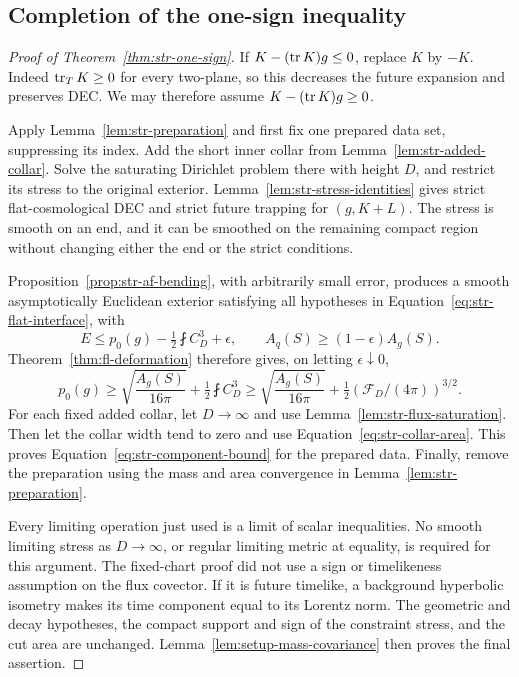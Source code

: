 \subsection{Completion of the one-sign inequality}

\begin{proof}[Proof of Theorem~\ref{thm:str-one-sign}]
If $K-(\operatorname{tr} K)g\leq0$, replace $K$ by $-K$. Indeed
$\operatorname{tr}_TK\geq0$ for every two-plane, so this decreases the future
expansion and preserves DEC. We may therefore assume
$K-(\operatorname{tr} K)g\geq0$.

Apply Lemma~\ref{lem:str-preparation} and first fix one prepared data
set, suppressing its index. Add the short inner collar from
Lemma~\ref{lem:str-added-collar}. Solve the saturating Dirichlet problem
there with height $D$, and restrict its stress to the original
exterior. Lemma~\ref{lem:str-stress-identities} gives strict
flat-cosmological DEC and strict future trapping for $(g,K+L)$.
The stress is smooth on an end, and it can be smoothed on the remaining
compact region without changing either the end or the strict
conditions.

Proposition~\ref{prop:str-af-bending}, with arbitrarily small error,
produces a smooth asymptotically Euclidean exterior satisfying all
hypotheses in Equation~\eqref{eq:str-flat-interface}, with
\[
 E\leq p_0(g)-\tfrac12\fint C_D^3+\epsilon,
 \qquad A_q(S)\geq(1-\epsilon)A_g(S).
\]
Theorem~\ref{thm:fl-deformation} therefore gives, on letting
$\epsilon\downarrow0$,
\[
 p_0(g)\geq\sqrt{\frac{A_g(S)}{16\pi}}
                       +\tfrac12\fint C_D^3
 \geq\sqrt{\frac{A_g(S)}{16\pi}}
                       +\tfrac12(\mathcal F_D/(4\pi))^{3/2}.
\]
For each fixed added collar, let $D\to\infty$ and use
Lemma~\ref{lem:str-flux-saturation}. Then let the collar width tend to
zero and use Equation~\eqref{eq:str-collar-area}. This proves
Equation~\eqref{eq:str-component-bound} for the prepared data. Finally,
remove the preparation using the mass and area convergence in
Lemma~\ref{lem:str-preparation}.

Every limiting operation just used is a limit of scalar inequalities.
No smooth limiting stress as $D\to\infty$, or regular limiting metric
at equality, is required for this argument. The fixed-chart proof did
not use a sign or timelikeness assumption on the flux covector. If it
is future timelike, a background hyperbolic isometry makes its time
component equal to its Lorentz norm. The geometric and decay
hypotheses, the compact support and sign of the constraint stress,
and the cut area are unchanged. Lemma~\ref{lem:setup-mass-covariance}
then proves the final assertion.
\end{proof}
